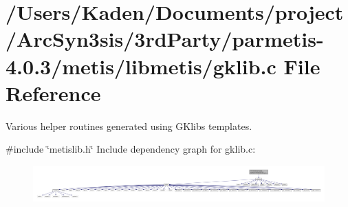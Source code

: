 \hypertarget{a00206}{}\section{/\+Users/\+Kaden/\+Documents/project/\+Arc\+Syn3sis/3rd\+Party/parmetis-\/4.0.3/metis/libmetis/gklib.c File Reference}
\label{a00206}


Various helper routines generated using G\+Klib\textquotesingle{}s templates.  


{\ttfamily \#include \char`\"{}metislib.\+h\char`\"{}}\newline
Include dependency graph for gklib.\+c\+:\nopagebreak
\begin{figure}[H]
\begin{center}
\leavevmode
\includegraphics[width=350pt]{a00207}
\end{center}
\end{figure}
